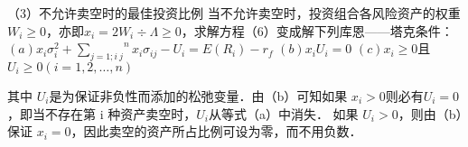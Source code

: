 
（3）不允许卖空时的最佳投资比例
当不允许卖空时，投资组合各风险资产的权重$W_{i}\geqslant0$，亦即$x_{i}=2W_{i}{\div}\Lambda\geqslant0$，求解方程（6）变成解下列库恩——塔克条件：
$(a) x_{i}{\sigma_{i}^{2}}+{{\sum_{j=1;i\ j}}^{n}}x_{i}{\sigma_{ij}}-U_{i}=E(R_{i})-r_{f}$
$(b)x_{i}U_{i}=0$
$(c)x_{i}\geqslant0$且$U_{i}\geqslant0$$(i=1,2,\dots,n)$

其中 $U_{i}$是为保证非负性而添加的松弛变量．由（b）可知如果 $x_{i}>0$则必有$U_{i}=0$，即当不存在第 i 种资产卖空时，$U_{i}$从等式（a）中消失． 如果 $U_{i}>0$，则由（b）保证 $x_{i}=0$，因此卖空的资产所占比例可设为零，而不用负数．




